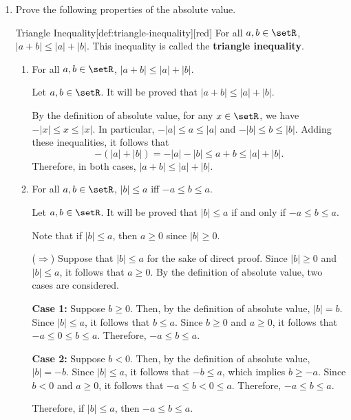 \begin{enumerate}
  \item Prove the following properties of the absolute value.
  \begin{define}{Triangle Inequality}[def:triangle-inequality][red]
    For all \(a,b\in\setR\), \(|a+b|\le|a|+|b|\).
    This inequality is called the \textbf{triangle inequality}.
  \end{define}
  \begin{enumerate}
    \item For all \(a,b\in\setR\), \(|a+b|\le|a|+|b|\).
    \begin{subprove}
      Let \(a, b \in \setR\).
      It will be proved that \(|a+b| \le |a| + |b|\).
      
      By the definition of absolute value, for any \(x \in \setR\), we have \(-|x| \le x \le |x|\).
      In particular, \(-|a| \le a \le |a|\) and \(-|b| \le b \le |b|\).
      Adding these inequalities, it follows that
      \[
        -(|a| + |b|) = -|a| - |b| \le a + b \le |a| + |b|.
      \]
      Therefore, in both cases, \(|a + b| \le |a| + |b|\).
    \end{subprove}
    \item For all \(a,b\in\setR\), \(|b|\le a\) iff \(-a\le b\le a\).
    \begin{subprove}
      Let \(a, b \in \setR\).
      It will be proved that \(|b| \le a\) if and only if \(-a \le b \le a\).
      
      Note that if \(|b| \le a\), then \(a \ge 0\) since \(|b| \ge 0\).
      
      (\(\Rightarrow\)) Suppose that \(|b| \le a\) for the sake of direct proof.
      Since \(|b| \ge 0\) and \(|b| \le a\), it follows that \(a \ge 0\).
      By the definition of absolute value, two cases are considered.
      
      \textbf{Case 1:} Suppose \(b \ge 0\).
      Then, by the definition of absolute value, \(|b| = b\).
      Since \(|b| \le a\), it follows that \(b \le a\).
      Since \(b \ge 0\) and \(a \ge 0\), it follows that \(-a \le 0 \le b \le a\).
      Therefore, \(-a \le b \le a\).
      
      \textbf{Case 2:} Suppose \(b < 0\).
      Then, by the definition of absolute value, \(|b| = -b\).
      Since \(|b| \le a\), it follows that \(-b \le a\), which implies \(b \ge -a\).
      Since \(b < 0\) and \(a \ge 0\), it follows that \(-a \le b < 0 \le a\).
      Therefore, \(-a \le b \le a\).
      
      Therefore, if \(|b| \le a\), then \(-a \le b \le a\).
      

\end{subprove}
\end{enumerate}
\end{enumerate}
